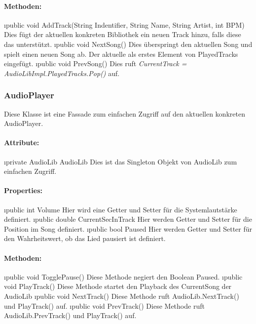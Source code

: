 \documentclass[../entwurf.tex]{subfiles}
\begin{document}
				\paragraph{Methoden:}
					\begin{itemize}
						\i{public void AddTrack(String Indentifier, String Name, String Artist, int BPM)} 
						Dies fügt der aktuellen konkreten Bibliothek ein neuen Track hinzu,
						falls diese das unterstützt.
						\i{public void NextSong()} Dies überspringt den aktuellen Song und spielt einen neuen Song ab.
						Der aktuelle als erstes Element von PlayedTracks eingefügt.
						\i{public void PrevSong()} Dies ruft \textit{CurrentTrack = AudioLibImpl.PlayedTracks.Pop()} auf.
					\end{itemize}
			\subsubsection{AudioPlayer}
				Diese Klasse ist eine Fassade zum einfachen Zugriff auf den aktuellen konkreten AudioPlayer.
				\paragraph{Attribute:}
					\begin{itemize}
						\i{private AudioLib AudioLib} Dies ist das Singleton Objekt von AudioLib zum einfachen Zugriff.
					\end{itemize}
				\paragraph{Properties:}
					\begin{itemize}
						\i{public int Volume} Hier wird eine Getter und Setter für die Systemlautstärke definiert.
						\i{public double CurrentSecInTrack} Hier werden Getter und Setter für die Position im Song definiert.
						\i{public bool Paused} Hier werden Getter und Setter für den Wahrheitswert, ob das Lied pausiert ist definiert.
					\end{itemize}
				\paragraph{Methoden:}
					\begin{itemize}
						\i{public void TogglePause()} Diese Methode negiert den Boolean Paused.
						\i{public void PlayTrack()} Diese Methode startet den Playback des CurrentSong der AudioLib
						\i{public void NextTrack()} Diese Methode ruft AudioLib.NextTrack() und PlayTrack() auf.
						\i{public void PrevTrack()} Diese Methode ruft AudioLib.PrevTrack() und PlayTrack() auf.
					\end{itemize}
\end{document}
